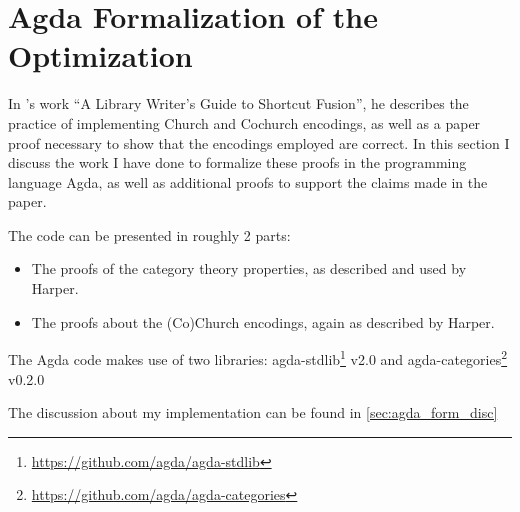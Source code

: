 \section{Agda Formalization of the Optimization}\label{sec:formalization}
In \cite{Harper2011}'s work ``A Library Writer's Guide to Shortcut Fusion'', he describes the practice of implementing Church and Cochurch encodings, as well as a paper proof necessary to show that the encodings employed are correct.
In this section I discuss the work I have done to formalize these proofs in the programming language Agda, as well as additional proofs to support the claims made in the paper.

The code can be presented in roughly 2 parts:
\begin{itemize}[noitemsep]
  \item The proofs of the category theory properties, as described and used by Harper.
  \item The proofs about the (Co)Church encodings, again as described by Harper.
\end{itemize}

The Agda code makes use of two libraries: agda-stdlib\footnote{\url{https://github.com/agda/agda-stdlib}} v2.0 and agda-categories\footnote{\url{https://github.com/agda/agda-categories}} v0.2.0


The discussion about my implementation can be found in \autoref{sec:agda_form_disc}




